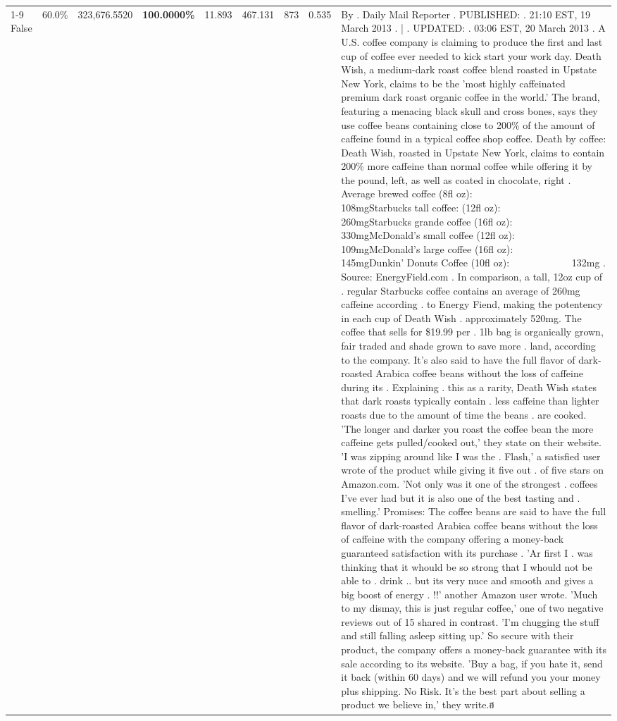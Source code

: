 \begin{table}[H]
{\begin{tabular}{lllrlllll}
\cline{1-9}
False & 60.0\% & 323,676.5520 & \bfseries \color{red} 100.0000\% & 11.893 & 467.131 & 873 & 0.535 & By . Daily Mail Reporter . PUBLISHED: . 21:10 EST, 19 March 2013 . | . UPDATED: . 03:06 EST, 20 March 2013 . A U.S. coffee company is claiming to produce the first and last cup of coffee ever needed to kick start your work day. Death Wish, a medium-dark roast coffee blend roasted in Upstate New York, claims to be the 'most highly caffeinated premium dark roast organic coffee in the world.' The brand, featuring a menacing black skull and cross bones, says they use coffee beans containing close to 200\% of the amount of caffeine found in a typical coffee shop coffee. Death by coffee: Death Wish, roasted in Upstate New York, claims to contain 200\% more caffeine than normal coffee while offering it by the pound, left, as well as coated in chocolate, right . Average brewed coffee (8fl oz):              108mgStarbucks tall coffee: (12fl oz):                260mgStarbucks grande coffee (16fl oz):         330mgMcDonald's small coffee (12fl oz):           109mgMcDonald's large coffee (16fl oz):           145mgDunkin' Donuts Coffee (10fl oz):             132mg . Source: EnergyField.com . In comparison, a tall, 12oz cup of . regular Starbucks coffee contains an average of 260mg caffeine according . to Energy Fiend, making the potentency in each cup of Death Wish . approximately 520mg. The coffee that sells for \$19.99 per . 1lb bag is organically grown, fair traded and shade grown to save more . land, according to the company. It's also said to have the full flavor of dark-roasted Arabica coffee beans without the loss of caffeine during its . Explaining . this as a rarity, Death Wish states that dark roasts typically contain . less caffeine than lighter roasts due to the amount of time the beans . are cooked. 'The longer and darker you roast the coffee bean the more caffeine gets pulled/cooked out,' they state on their website. 'I was zipping around like I was the . Flash,' a satisfied user wrote of the product while giving it five out . of five stars on Amazon.com. 'Not only was it one of the strongest . coffees I've ever had but it is also one of the best tasting and . smelling.’ Promises: The coffee beans are said to have the full flavor of dark-roasted Arabica coffee beans without the loss of caffeine with the company offering a money-back guaranteed satisfaction with its purchase . 'Ar first I . was thinking that it whould be so strong that I whould not be able to . drink .. but its very nuce and smooth and gives a big boost of energy . !!' another Amazon user wrote. 'Much to my dismay, this is just regular coffee,' one of two negative reviews out of 15 shared in contrast. 'I'm chugging the stuff and still falling asleep sitting up.' So secure with their product, the company offers a money-back guarantee with its sale according to its website. 'Buy a bag, if you hate it, send it back (within 60 days) and we will refund you your money plus shipping. No Risk. It’s the best part about selling a product we believe in,' they write.ฮ \\

\end{tabular}}
\end{table}
